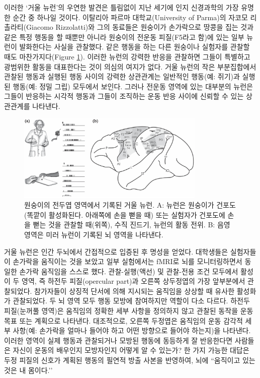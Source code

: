 \documentclass[openany]{book}
\begin{document}
\begin{appendices}
이러한 `거울 뉴런’의 우연한 발견은 틀림없이 지난 세기에 인지 신경과학의 가장 유명한 순간 중 하나일 것이다. 이탈리아 파르마 대학교(University of Parma)의 자코모 리촐라티(Giacomo Rizzolatti)와 그의 동료들은 원숭이가 손가락으로 땅콩을 집는 것과 같은 특정 행동을 할 때뿐만 아니라 원숭이의 전운동 피질(F5라고 함)에 있는 일부 뉴런이 발화한다는 사실을 관찰했다. 같은 행동을 하는 다른 원숭이나 실험자를 관찰할 때도 마찬가지다(Figure \ref{fig:5_8}). 이러한 뉴런의 강력한 반응을 관찰하면 그들이 특별하고 광범위한 활동을 대표한다는 것이 의심의 여지가 없다. 거울 뉴런의 작은 부분집합에서 관찰된 행동과 실행된 행동 사이의 강력한 상관관계는 일반적인 행동(예: 쥐기)과 실행된 행동(예: 정밀 그립) 모두에서 보인다. 그러나 전운동 영역에 있는 대부분의 뉴런은 그들이 반응하는 시각적 행동과 그들이 조직하는 운동 반응 사이에 신뢰할 수 있는 상관관계를 나타낸다.
\begin{figure}[htb!]
  \centering
  \includegraphics[width=0.8\textwidth]{image/5_8}
  \caption{원숭이의 전두엽 영역에서 기록된 거울 뉴런.
  A: 뉴런은 원숭이가 건포도(똑깥이 활성화된다. 아래쪽에 손을 뻗을 때) 또는 실험자가 건포도에 손을 뻗는 것을 관찰할 때(위쪽), 수직 진드기, 뉴런의 활동 전위.
  B: 음영 영역은 미러 뉴런이 기록된 뇌 영역을 나타낸다.}
  \label{fig:5_8}
\end{figure}

거울 뉴런은 인간 두뇌에서 간접적으로 입증된 후 명성을 얻었다. 대학생들은 실험자들이 손가락을 움직이는 것을 보았고 일부 실험에서는 fMRI로 뇌를 모니터링하면서 동일한 손가락 움직임을 스스로 했다. 관찰-실행(액선) 및 관찰-전용 조건 모두에서 활성이 두 영역, 즉 하전두 피질(opercular part)과 오른쪽 상두정엽의 가장 앞부분에서 관찰되었다. 참가자들이 상징적 단서에 의해 지시되는 움직임을 상상할 때 유사한 활성화가 관찰되었다. 두 뇌 영역 모두 행동 모방에 참여하지만 역할이 다소 다르다. 하전두 피질(눈꺼풀 영역)은 움직임의 정확한 세부 사항을 정의하지 않고 관찰된 동작을 운동 목표 또는 계획으로 나타낸다. 대조적으로, 오른쪽 두정엽은 움직임의 운동 감각적 세부 사항(예: 손가락을 얼마나 들어야 하고 어떤 방향으로 들어야 하는지)을 나타낸다. 이러한 영역이 실제 행동과 관찰되거나 모방된 행동에 동등하게 잘 반응한다면 사람들은 자신이 운동의 배우인지 모방자인지 어떻게 알 수 있는가? 한 가지 가능한 대답은 두정 피질의 신호가 계획된 행동의 필연적 방출 사본을 반영하여, 뇌에 ``움직이고 있는 것은 내 몸이다.’’


\end{appendices}
\end{document}
